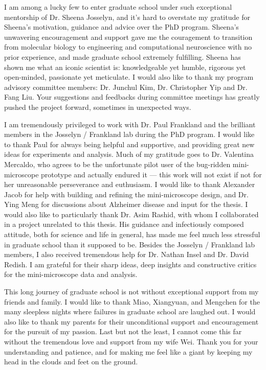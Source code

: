 I am among a lucky few to enter graduate school under such exceptional mentorship of Dr. Sheena Josselyn, and it's hard to overstate my gratitude for Sheena's motivation, guidance and advice over the PhD program. Sheena's unwavering encouragement and support gave me the couragement to transition from molecular biology to engineering and computational neuroscience with no prior experience, and made graduate school extremely fulfilling. Sheena has shown me what an iconic scientist is: knowledgeable yet humble, rigorous yet open-minded, passionate yet meticulate. I would also like to thank my program advisory committee members: Dr. Junchul Kim, Dr. Christopher Yip and Dr. Fang Liu. Your suggestions and feedbacks during committee meetings has greatly pushed the project forward, sometimes in unexpected ways. 

I am tremendously privileged to work with Dr. Paul Frankland and the brilliant members in the Josselyn \slash{} Frankland lab during the PhD program. I would like to thank Paul for always being helpful and supportive, and providing great new ideas for experiments and analysis. Much of my gratitude goes to Dr. Valentina Mercaldo, who agrees to be the unfortunate pilot user of the bug-ridden mini-microscope prototype and actually endured it --- this work will not exist if not for her unreasonable perseverance and euthusiasm. I would like to thank Alexander Jacob for help with building and refining the mini-microscope design, and Dr. Ying Meng for discussions about Alzheimer disease and input for the thesis. I would also like to particularly thank Dr. Asim Rashid, with whom I collaborated in a project unrelated to this thesis. His guidance and infectiously composed attitude, both for science and life in general, has made me feel much less stressful in graduate school than it supposed to be. Besides the Josselyn \slash{} Frankland lab members, I also received tremendous help for Dr. Nathan Insel and Dr. David Redish. I am grateful for their sharp ideas, deep insights and constructive critics for the mini-microscope data and analysis. 

This long journey of graduate school is not without exceptional support from my friends and family.  I would like to thank Miao, Xiangyuan, and Mengchen for the many sleepless nights where failures in graduate school are laughed out. I would also like to thank my parents for their unconditional support and encouragement for the pursuit of my passion. Last but not the least, I cannot come this far without the tremendous love and support from my wife Wei. Thank you for your understanding and patience, and for making me feel like a giant by keeping my head in the clouds and feet on the ground. 


